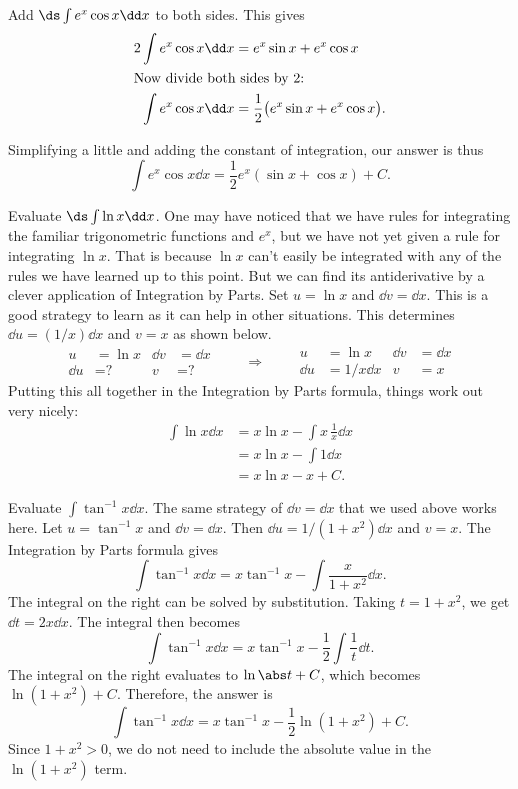 \begin{example}
Add $\ds\int e^x\cos x\dd x$ to both sides. This gives 
\begin{align*}
2\int e^x\cos x\dd x & = e^x\sin x + e^x\cos x \\
\intertext{Now divide both sides by 2:}
\int e^x\cos x\dd x & = \frac{1}{2}\bigl(e^x\sin x + e^x\cos x\bigr).
\end{align*}

Simplifying a little and adding the constant of integration, our answer is thus
\[\int e^x\cos x\dd x = \frac12e^x\left(\sin x + \cos x\right)+C.\]
\end{example}

\begin{example}\label{ex_ibp5}%
Evaluate $\ds\int \ln x\dd x$.
\solution
One may have noticed that we have rules for integrating the familiar trigonometric functions and $e^x$, but we have not yet given a rule for integrating $\ln x$.  That is because $\ln x$ can't easily be integrated with any of the rules we have learned up to this point.  But we can find its antiderivative by a clever application of Integration by Parts.  Set $u=\ln x$ and $\dd v=\dd x$.  This is a good strategy to learn as it can help in other situations. This determines $\dd u=(1/x)\dd x$ and $v=x$ as shown below.
\[
\begin{aligned}
u&= \ln x & \dd v&=\dd x\\
\dd u&= \text{?} & v&=\text{?}
\end{aligned}
\qquad\Rightarrow\qquad
\begin{aligned}
u&= \ln x& \dd v&=\dd x\\
\dd u&= 1/x\dd x & v&=x
\end{aligned}
\]
Putting this all together in the Integration by Parts formula, things work out very nicely:
\begin{align*}
 \int \ln x\dd x
 &= x\ln x - \int x\,\frac1x\dd x \\
 &= x\ln x - \int 1\dd x \\
 &= x\ln x - x + C.
\end{align*}
\end{example}

\begin{example}\label{ex_ibp6}%
Evaluate $\displaystyle \int \tan^{-1} x\dd x$.
\solution
The same strategy of $\dd v=\dd x$ that we used above works here.  Let $u=\tan^{-1} x$ and $\dd v=\dd x$.  Then $\dd u=1/(1+x^2)\dd x$ and $v=x$.  The Integration by Parts formula gives
\[\int \tan^{-1} x\dd x = x\tan^{-1} x - \int \frac x{1+x^2}\dd x.\]
The integral on the right can be solved by substitution.  Taking $t=1+x^2$, we get $\dd t=2x\dd x$.  The integral then becomes
\[\int \tan^{-1} x\dd x = x\tan^{-1} x - \frac12\int \frac 1{t}\dd t.\]
The integral on the right evaluates to $\ln\abs t+C$, which becomes $\ln(1+x^2)+C$.  Therefore, the answer is
\[\int \tan^{-1} x\dd x = x\tan^{-1} x - \frac12\ln(1+x^2) + C.\]
Since $1+x^2>0$, we do not need to include the absolute value in the $\ln(1+x^2)$ term.
\end{example}

